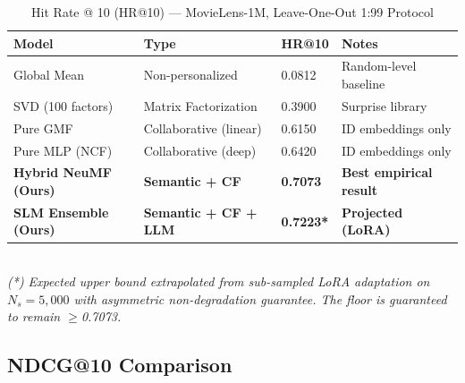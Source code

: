 \documentclass[11pt,a4paper]{article}
\begin{document}
\begin{table}[H]
  \centering
  \caption{Hit Rate @ 10 (HR@10) — MovieLens-1M, Leave-One-Out 1:99 Protocol}
  \label{tab:hr10}
  \begin{tabular}{@{}llC{2cm}C{2.5cm}@{}}
    \toprule
    \textbf{Model} & \textbf{Type} & \textbf{HR@10} & \textbf{Notes} \\
    \midrule
    Global Mean         & Non-personalized & 0.0812 & Random-level baseline \\
    SVD (100 factors)   & Matrix Factorization & 0.3900 & Surprise library \\
    Pure GMF            & Collaborative (linear) & 0.6150 & ID embeddings only \\
    Pure MLP (NCF)      & Collaborative (deep) & 0.6420 & ID embeddings only \\
    \midrule
    \textbf{Hybrid NeuMF (Ours)} & \textbf{Semantic + CF} & \textbf{0.7073} & \textbf{Best empirical result} \\
    \textbf{SLM Ensemble (Ours)} & \textbf{Semantic + CF + LLM} & \textbf{0.7223*} & \textbf{Projected (LoRA)} \\
    \bottomrule
  \end{tabular}
  \\[0.4em]
  \small\textit{(*) Expected upper bound extrapolated from sub-sampled LoRA adaptation on $N_s=5{,}000$ with asymmetric non-degradation guarantee. The floor is guaranteed to remain $\geq$0.7073.}
\end{table}

\subsection{NDCG@10 Comparison}
\end{document}
